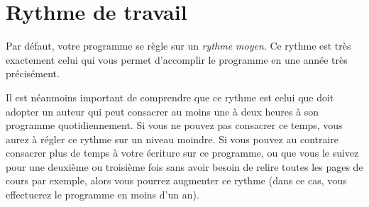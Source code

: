 % 
% 
% 
% 
% 
% 
% 
% 

\section{Rythme de travail}\hypertarget{rythme-travail}{}\label{rythme-travail}

Par défaut, votre programme se règle sur un \emph{rythme moyen}. Ce rythme est très exactement celui qui vous permet d'accomplir le programme en une année très précisément.

Il est néanmoins important de comprendre que ce rythme est celui que doit adopter un auteur qui peut consacrer au moins une à deux heures à son programme quotidiennement. Si vous ne pouvez pas consacrer ce temps, vous aurez à régler ce rythme sur un niveau moindre. Si vous pouvez au contraire consacrer plus de temps à votre écriture sur ce programme, ou que vous le suivez pour une deuxième ou troisième fois sans avoir besoin de relire toutes les pages de cours par exemple, alors vous pourrez augmenter ce rythme (dans ce cas, vous effectuerez le programme en moins d'un an).

